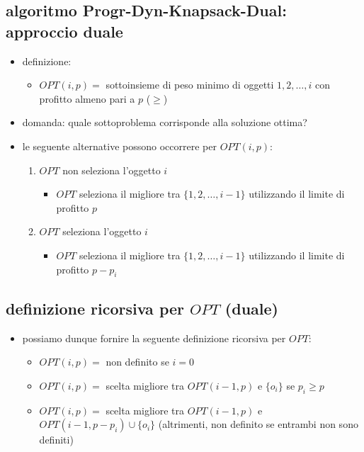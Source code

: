 
\subsection*{algoritmo Progr-Dyn-Knapsack-Dual: approccio duale}
\begin{flushleft}
	\begin{itemize}
		\item definizione:
		\begin{itemize}
			\item $OPT(i,p)=$ sottoinsieme di peso minimo di oggetti $1,2,\ldots,i$ con profitto almeno pari a $p$ ($\geq$)
		\end{itemize}
		\item domanda: quale sottoproblema corrisponde alla soluzione ottima?
		\item le seguente alternative possono occorrere per $OPT(i,p)$:
		\begin{enumerate}
			\item $OPT$ non seleziona l'oggetto $i$
			\begin{itemize}
				\item $OPT$ seleziona il migliore tra $\{1,2,\ldots,i-1\}$ utilizzando il limite di profitto $p$
			\end{itemize}
			\item $OPT$ seleziona l'oggetto $i$
			\begin{itemize}
				\item $OPT$ seleziona il migliore tra $\{1,2,\ldots,i-1\}$ utilizzando il limite di profitto $p-p_i$
			\end{itemize}
		\end{enumerate}
	\end{itemize}
\end{flushleft}


\subsection*{definizione ricorsiva per $OPT$ (duale)}
\begin{flushleft}
	\begin{itemize}
		\item possiamo dunque fornire la seguente definizione ricorsiva per $OPT$:
		\begin{itemize}
			\item $OPT(i,p)=$ non definito se $i=0$
			\item $OPT(i,p)=$ scelta migliore tra $OPT(i-1,p)$ e $\{o_i\}$ se $p_i\geq p$
			\item $OPT(i,p)=$ scelta migliore tra $OPT(i-1,p)$ e $OPT(i-1,p-p_i)\cup\{o_i\}$ (altrimenti, non definito se entrambi non sono definiti)
		\end{itemize}
	\end{itemize}
\end{flushleft}

